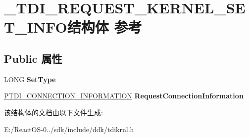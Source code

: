 \hypertarget{struct___t_d_i___r_e_q_u_e_s_t___k_e_r_n_e_l___s_e_t___i_n_f_o}{}\section{\+\_\+\+T\+D\+I\+\_\+\+R\+E\+Q\+U\+E\+S\+T\+\_\+\+K\+E\+R\+N\+E\+L\+\_\+\+S\+E\+T\+\_\+\+I\+N\+F\+O结构体 参考}
\label{struct___t_d_i___r_e_q_u_e_s_t___k_e_r_n_e_l___s_e_t___i_n_f_o}
\subsection*{Public 属性}
\begin{DoxyCompactItemize}
\item 
\mbox{\label{struct___t_d_i___r_e_q_u_e_s_t___k_e_r_n_e_l___s_e_t___i_n_f_o_a37de75c18c4a1a6af8281e4d77a781cb}} 
L\+O\+NG {\bfseries Set\+Type}
\item 
\mbox{\label{struct___t_d_i___r_e_q_u_e_s_t___k_e_r_n_e_l___s_e_t___i_n_f_o_ae33b0c3d178ee3c37a85f0cc21f047da}} 
\hyperlink{struct___t_d_i___c_o_n_n_e_c_t_i_o_n___i_n_f_o_r_m_a_t_i_o_n}{P\+T\+D\+I\+\_\+\+C\+O\+N\+N\+E\+C\+T\+I\+O\+N\+\_\+\+I\+N\+F\+O\+R\+M\+A\+T\+I\+ON} {\bfseries Request\+Connection\+Information}
\end{DoxyCompactItemize}


该结构体的文档由以下文件生成\+:\begin{DoxyCompactItemize}
\item 
E\+:/\+React\+O\+S-\/0../sdk/include/ddk/tdikrnl.\+h\end{DoxyCompactItemize}
